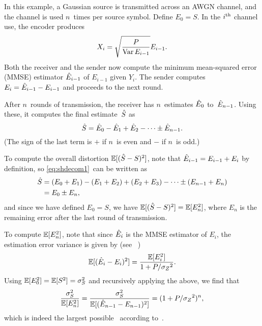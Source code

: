 \begin{example}
  \label{ex:gaussfb}
  In this example, a Gaussian source is transmitted across an AWGN channel, and
  the channel is used $n$~times per source symbol.  Define $E_0 = S$. In the
  $i{^{\text{th}}}$ channel use, the encoder produces
  \begin{equation}
    \label{eq:gaussfbxi}
    X_i = \sqrt{\frac{P}{\operatorname{Var} E_{i-1}}} E_{i-1}.
  \end{equation}
  Both the receiver and the sender now compute the minimum mean-squared
  error (MMSE) estimator $\hat{E}_{i-1}$ of $E_{i-1}$ given $Y_i$. The sender
  computes $E_i = \hat{E}_{i-1} - E_{i-1}$ and proceeds to the next round.

  After $n$~rounds of transmission, the receiver has $n$~estimates $\hat{E}_0$
  to~$\hat{E}_{n-1}$. Using these, it computes the final estimate~${\hat{S}}$ as
  \begin{equation}
    \label{eq:shdecom1}
    {\hat{S}} = \hat{E}_0 - \hat{E}_1 + \hat{E}_2 - \cdots \pm \hat{E}_{n-1}.
  \end{equation}
  (The sign of the last term is $+$ if $n$~is even and $-$ if $n$~is odd.)

  To compute the overall distortion ${\mathbb{E}[({\hat{S}} - S)^2]}$, note that $\hat{E}_{i-1} = E_{i-1} +
  E_i$ by definition, so \eqref{eq:shdecom1}~can be written as
  \begin{align*}
    {\hat{S}} &= (E_0 + E_1) - (E_1 + E_2) + (E_2 + E_3) - \cdots \pm (E_{n-1} + E_n)
    \\
    &= E_0 \pm E_n,
  \end{align*}
  and since we have defined $E_0 = S$, we have ${\mathbb{E}[({\hat{S}} - S)^2]} = \mathbb{E}[E_n^2]$, where $E_n$
  is the remaining error after the last round of transmission.

  To compute $\mathbb{E}[E_n^2]$, note that since $\hat{E}_i$ is the MMSE estimator of
  $E_i$, the estimation error variance is given by (see
  \eg~\cite[Section~8.3]{Scharf1990})
  \begin{equation}
    \label{eq:gaussvardec}
    \mathbb{E}[(\hat{E}_i - E_i)^2] = \frac{\mathbb{E}[E_i^2]}{1 + P/{{\sigma_Z}^2}}.
  \end{equation}
  Using $\mathbb{E}[E_0^2] = \mathbb{E}[S^2] = {\sigma_S^2}$ and recursively applying the above, we find
  that
  \begin{equation*}
    \frac{{\sigma_S^2}}{\mathbb{E}[E_n^2]} = \frac{{\sigma_S^2}}{\mathbb{E}[(\hat{E}_{n-1} - E_{n-1})^2]} =
    (1 + P/{{\sigma_Z}^2})^n,
  \end{equation*}
  which is indeed the largest possible \sdr\ according
  to~.
\end{example}

